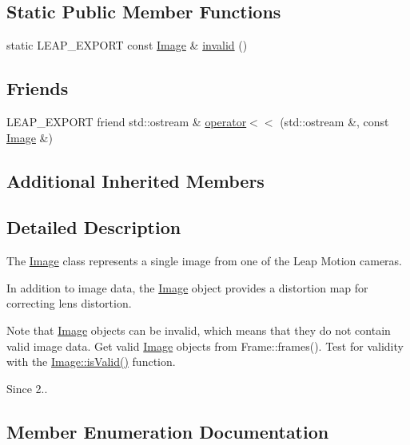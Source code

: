 \subsection*{Static Public Member Functions}
\begin{DoxyCompactItemize}
\item 
static L\+E\+A\+P\+\_\+\+E\+X\+P\+O\+RT const \hyperlink{class_leap_1_1_image}{Image} \& \hyperlink{class_leap_1_1_image_ab75d5df98401a07078e22916c828c0b5}{invalid} ()
\end{DoxyCompactItemize}
\subsection*{Friends}
\begin{DoxyCompactItemize}
\item 
L\+E\+A\+P\+\_\+\+E\+X\+P\+O\+RT friend std\+::ostream \& \hyperlink{class_leap_1_1_image_acb3061d938151f14c3f2b35c2089f730}{operator$<$$<$} (std\+::ostream \&, const \hyperlink{class_leap_1_1_image}{Image} \&)
\end{DoxyCompactItemize}
\subsection*{Additional Inherited Members}


\subsection{Detailed Description}
The \hyperlink{class_leap_1_1_image}{Image} class represents a single image from one of the Leap Motion cameras.

In addition to image data, the \hyperlink{class_leap_1_1_image}{Image} object provides a distortion map for correcting lens distortion.


\begin{DoxyCodeInclude}
\end{DoxyCodeInclude}


Note that \hyperlink{class_leap_1_1_image}{Image} objects can be invalid, which means that they do not contain valid image data. Get valid \hyperlink{class_leap_1_1_image}{Image} objects from Frame\+::frames(). Test for validity with the \hyperlink{class_leap_1_1_image_a536cc04b3a40a5e3527ca45d894d57fd}{Image\+::is\+Valid()} function. \begin{DoxySince}{Since}
2.. 
\end{DoxySince}


\subsection{Member Enumeration Documentation}
\mbox{\label{class_leap_1_1_image_acefbe5d3803afc9f433a6e3856d242d1}} 
